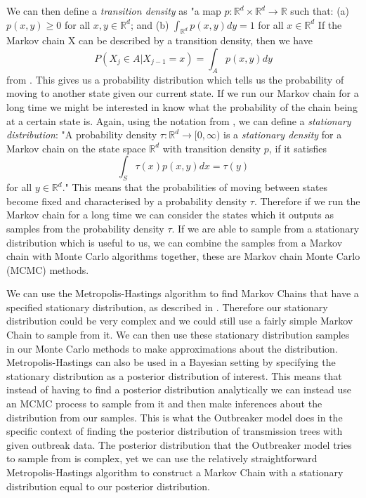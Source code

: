\documentclass[11pt,a4paper]{report}
\begin{document}
We can then define a \emph{transition density} as "a map $p: \mathbb{R}^d \times \mathbb{R}^d \rightarrow \mathbb{R}$ such that: \newline
(a) $p(x,y) \geq 0$ for all $x,y \in \mathbb{R}^d$; and \newline
(b) $\int_{\mathbb{R}^d} p(x,y) dy = 1$ for all $x \in \mathbb{R}^d$ \newline
If the Markov chain X can be described by a transition density, then we have 
\begin{equation}
P(X_j \in A | X_{j-1} = x) = \int_A p(x,y)dy
\end{equation}
from \citet{Voss14}.
This gives us a probability distribution which tells us the probability of moving to another state given our current state. If we run our Markov chain for a long time we might be interested in know what the probability of the chain being at a certain state is. Again, using the notation from \citet{Voss14}, we can define a \emph{stationary distribution}: "A probability density $\tau:\mathbb{R}^{d} \rightarrow [0,\infty)$ is a \emph{stationary density} for a Markov chain on the state space $\mathbb{R}^d$ with transition density $p$, if it satisfies
\begin{equation}
\int_S \tau(x)p(x,y)dx = \tau(y)
\end{equation}
for all $y \in \mathbb{R}^d$."
This means that the probabilities of moving between states become fixed and characterised by a probability density $\tau$. Therefore if we run the Markov chain for a long time we can consider the states which it outputs as samples from the probability density $\tau$. If we are able to sample from a stationary distribution which is useful to us, we can combine the samples from a Markov chain with Monte Carlo algorithms together, these are Markov chain Monte Carlo (MCMC) methods.

We can use the Metropolis-Hastings algorithm to find Markov Chains that have a specified stationary distribution, as described in \citet{Gilks96}. Therefore our stationary distribution could be very complex and we could still use a fairly simple Markov Chain to sample from it. We can then use these stationary distribution samples in our Monte Carlo methods to make approximations about the distribution. Metropolis-Hastings can also be used in a Bayesian setting by specifying the stationary distribution as a posterior distribution of interest. This means that instead of having to find a posterior distribution analytically we can instead use an MCMC process to sample from it and then make inferences about the distribution from our samples. This is what the Outbreaker model does in the specific context of finding the posterior distribution of transmission trees with given outbreak data. The posterior distribution that the Outbreaker model tries to sample from is complex, yet we can use the relatively straightforward Metropolis-Hastings algorithm to construct a Markov Chain with a stationary distribution equal to our posterior distribution.
\end{document}
